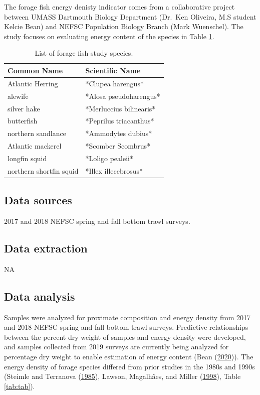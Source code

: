 \documentclass[
]{book}
\begin{document}
The forage fish energy denisty indicator comes from a collaborative project between UMASS Dartmouth Biology Department (Dr.~Ken Oliveira, M.S student Kelcie Bean) and NEFSC Population Biology Branch (Mark Wuenschel). The study focuses on evaluating energy content of the species in Table \ref{tab:foragefish}.

\begin{table}

\caption{\label{tab:foragefish}List of forage fish study species.}
\centering
\begin{tabular}[t]{ll}
\toprule
Common Name & Scientific Name\\
\midrule
Atlantic Herring & *Clupea harengus*\\
alewife & *Alosa pseudoharengus*\\
silver hake & *Merluccius bilinearis*\\
butterfish & *Peprilus triacanthus*\\
northern sandlance & *Ammodytes dubius*\\
\addlinespace
Atlantic mackerel & *Scomber Scombrus*\\
longfin squid & *Loligo pealeii*\\
northern shortfin squid & *Illex illecebrosus*\\
\bottomrule
\end{tabular}
\end{table}

\hypertarget{data-sources-15}{%
\subsection{Data sources}\label{data-sources-15}}

2017 and 2018 NEFSC spring and fall bottom trawl surveys.

\hypertarget{data-extraction-14}{%
\subsection{Data extraction}\label{data-extraction-14}}

NA

\hypertarget{data-analysis-14}{%
\subsection{Data analysis}\label{data-analysis-14}}

Samples were analyzed for proximate composition and energy density from 2017 and 2018 NEFSC spring and fall bottom trawl surveys. Predictive relationships between the percent dry weight of samples and energy density were developed, and samples collected from 2019 surveys are currently being analyzed for percentage dry weight to enable estimation of energy content (Bean (\protect\hyperlink{ref-Bean2020}{2020})). The energy density of forage species differed from prior studies in the 1980s and 1990s (Steimle and Terranova (\protect\hyperlink{ref-steimle1985}{1985}), Lawson, Magalhães, and Miller (\protect\hyperlink{ref-lawson1998}{1998}), Table \ref{tab:tab}).
\end{document}
